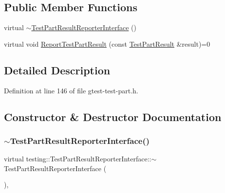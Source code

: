 \subsection*{Public Member Functions}
\begin{DoxyCompactItemize}
\item 
virtual \hyperlink{classtesting_1_1TestPartResultReporterInterface_a338b51591ed654f84dc0feaaf2b66917}{$\sim$\+Test\+Part\+Result\+Reporter\+Interface} ()
\item 
virtual void \hyperlink{classtesting_1_1TestPartResultReporterInterface_aa2f920e7a5a0a6d0faf19e3727928c22}{Report\+Test\+Part\+Result} (const \hyperlink{classtesting_1_1TestPartResult}{Test\+Part\+Result} \&result)=0
\end{DoxyCompactItemize}


\subsection{Detailed Description}


Definition at line 146 of file gtest-\/test-\/part.\+h.



\subsection{Constructor \& Destructor Documentation}
\mbox{\label{classtesting_1_1TestPartResultReporterInterface_a338b51591ed654f84dc0feaaf2b66917}} 
\subsubsection{\texorpdfstring{$\sim$\+Test\+Part\+Result\+Reporter\+Interface()}{~TestPartResultReporterInterface()}}
{\footnotesize\ttfamily virtual testing\+::\+Test\+Part\+Result\+Reporter\+Interface\+::$\sim$\+Test\+Part\+Result\+Reporter\+Interface (\begin{DoxyParamCaption}{ }\end{DoxyParamCaption})\hspace{0.3cm}{\ttfamily [inline]}, {\ttfamily [virtual]}}



